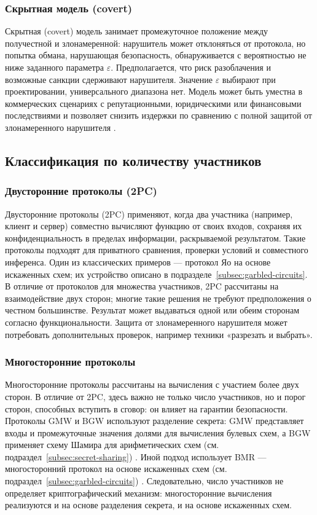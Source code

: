 \subsubsection{Скрытная модель (covert)}
Скрытная (covert) модель занимает промежуточное положение между получестной и злонамеренной: нарушитель может отклоняться от протокола, но попытка обмана, нарушающая безопасность, обнаруживается с вероятностью не ниже заданного параметра \(\varepsilon\). Предполагается, что риск разоблачения и возможные санкции сдерживают нарушителя. Значение \(\varepsilon\) выбирают при проектировании, универсального диапазона нет. Модель может быть уместна в коммерческих сценариях с репутационными, юридическими или финансовыми последствиями и позволяет снизить издержки по сравнению с полной защитой от злонамеренного нарушителя \cite{06}.

\subsection{Классификация по количеству участников}

\subsubsection{Двусторонние протоколы (2PC)}
Двусторонние протоколы (2PC) применяют, когда два участника (например, клиент и сервер) совместно вычисляют функцию от своих входов, сохраняя их конфиденциальность в пределах информации, раскрываемой результатом. Такие протоколы подходят для приватного сравнения, проверки условий и совместного инференса. Один из классических примеров --- протокол Яо на основе искаженных схем; их устройство описано в подразделе~\ref{subsec:garbled-circuits}. В отличие от протоколов для множества участников, 2PC рассчитаны на взаимодействие двух сторон; многие такие решения не требуют предположения о честном большинстве. Результат может выдаваться одной или обеим сторонам согласно функциональности. Защита от злонамеренного нарушителя может потребовать дополнительных проверок, например техники «разрезать и выбрать».

\subsubsection{Многосторонние протоколы}
Многосторонние протоколы рассчитаны на вычисления с участием более двух сторон. В отличие от 2PC, здесь важно не только число участников, но и порог сторон, способных вступить в сговор: он влияет на гарантии безопасности. Протоколы GMW и BGW используют разделение секрета: GMW представляет входы и промежуточные значения долями для вычисления булевых схем, а BGW применяет схему Шамира для арифметических схем (см. подраздел~\ref{subsec:secret-sharing}) \cite{06}. Иной подход использует BMR --- многосторонний протокол на основе искаженных схем (см. подраздел~\ref{subsec:garbled-circuits}) \cite{16}. Следовательно, число участников не определяет криптографический механизм: многосторонние вычисления реализуются и на основе разделения секрета, и на основе искаженных схем.


